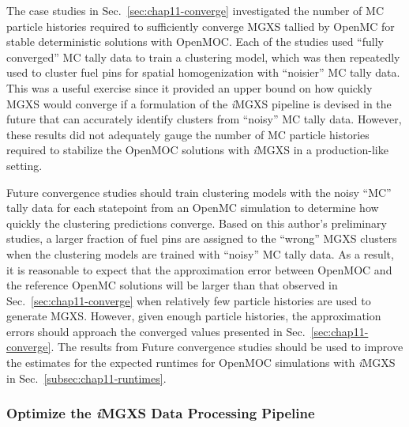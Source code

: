 The case studies in Sec.~\ref{sec:chap11-converge} investigated the number of \ac{MC} particle histories required to sufficiently converge \ac{MGXS} tallied by OpenMC for stable deterministic solutions with OpenMOC. Each of the studies used ``fully converged'' \ac{MC} tally data to train a clustering model, which was then repeatedly used to cluster fuel pins for spatial homogenization with ``noisier'' \ac{MC} tally data. This was a useful exercise since it provided an upper bound on how quickly \ac{MGXS} would converge if a formulation of the \textit{i}\ac{MGXS} pipeline is devised in the future that can accurately identify clusters from ``noisy'' \ac{MC} tally data. However, these results did not adequately gauge the number of \ac{MC} particle histories required to stabilize the OpenMOC solutions with \textit{i}\ac{MGXS} in a production-like setting.

Future convergence studies should train clustering models with the noisy ``MC'' tally data for each statepoint from an OpenMC simulation to determine how quickly the clustering predictions converge. Based on this author's preliminary studies, a larger fraction of fuel pins are assigned to the ``wrong'' \ac{MGXS} clusters when the clustering models are trained with ``noisy'' \ac{MC} tally data. As a result, it is reasonable to expect that the approximation error between OpenMOC and the reference OpenMC solutions will be larger than that observed in Sec.~\ref{sec:chap11-converge} when relatively few particle histories are used to generate \ac{MGXS}. However, given enough particle histories, the approximation errors should approach the converged values presented in Sec.~\ref{sec:chap11-converge}. The results from Future convergence studies should be used to improve the estimates for the expected runtimes for OpenMOC simulations with \textit{i}\ac{MGXS} in Sec.~\ref{subsec:chap11-runtimes}.


\subsubsection{Optimize the \textit{i}MGXS Data Processing Pipeline}
\label{subsubsec:chap12-optimize-imgxs}

